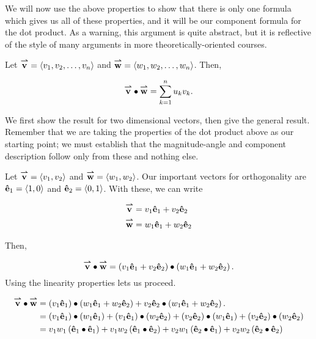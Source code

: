 \documentclass{ximera}
\begin{document}
We will now use the above properties to show that there is only one formula which gives us all of these properties, and it
will be our component formula for the dot product.  As a warning, this argument is quite abstract, but it is reflective of the style of many arguments in more theoretically-oriented courses.

\begin{theorem}
  Let ${\overset{\boldsymbol{\rightharpoonup}}{\mathbf{v}}} =\left\langle v_1,v_2,\ldots,v_n\right\rangle$ and ${\overset{\boldsymbol{\rightharpoonup}}{\mathbf{w}}} =\left\langle w_1,w_2,\ldots,w_n\right\rangle$.  Then, 
  
  \[
  {\overset{\boldsymbol{\rightharpoonup}}{\mathbf{v}}} \bullet {\overset{\boldsymbol{\rightharpoonup}}{\mathbf{w}}} = \sum_{k=1}^n u_kv_k.
  \]
\begin{explanation}
We first show the result for two dimensional vectors, then give the general result.  Remember that we are taking the properties of the dot product above as our starting point; we must establish that the magnitude-angle and component description follow only from these and nothing else.

Let ${\overset{\boldsymbol{\rightharpoonup}}{\mathbf{v}}}=\left\langle v_1,v_2\right\rangle$ and ${\overset{\boldsymbol{\rightharpoonup}}{\mathbf{w}}} = \left\langle w_1,w_2\right\rangle$.  Our important vectors for orthogonality are $\mathbf{\hat{e}}_1=\left\langle 1,0\right\rangle$ and $\mathbf{\hat{e}}_2=\left\langle 0,1\right\rangle$.  With these, we can write

\begin{align*}
{\overset{\boldsymbol{\rightharpoonup}}{\mathbf{v}}} &=  v_1\mathbf{\hat{e}}_1 +v_2\mathbf{\hat{e}}_2 \\
{\overset{\boldsymbol{\rightharpoonup}}{\mathbf{w}}} &= w_1\mathbf{\hat{e}}_1 +w_2\mathbf{\hat{e}}_2 \\
\end{align*}

Then, 

\[
{\overset{\boldsymbol{\rightharpoonup}}{\mathbf{v}}} \bullet {\overset{\boldsymbol{\rightharpoonup}}{\mathbf{w}}} = \left(v_1\mathbf{\hat{e}}_1 +v_2\mathbf{\hat{e}}_2\right) \bullet  \left(w_1\mathbf{\hat{e}}_1 +w_2\mathbf{\hat{e}}_2\right).
\]
Using the linearity properties lets us proceed.

\begin{align*}
{\overset{\boldsymbol{\rightharpoonup}}{\mathbf{v}}} \bullet {\overset{\boldsymbol{\rightharpoonup}}{\mathbf{w}}} &= \left(v_1\mathbf{\hat{e}}_1\right) \bullet  \left(w_1\mathbf{\hat{e}}_1 +w_2\mathbf{\hat{e}}_2\right) +v_2\mathbf{\hat{e}}_2 \bullet  \left(w_1\mathbf{\hat{e}}_1 +w_2\mathbf{\hat{e}}_2\right). \\
&= \left(v_1\mathbf{\hat{e}}_1\right) \bullet  \left(w_1\mathbf{\hat{e}}_1\right) +  \left(v_1\mathbf{\hat{e}}_1\right) \bullet  \left(w_2\mathbf{\hat{e}}_2\right)+ \left(v_2\mathbf{\hat{e}}_2\right) \bullet  \left(w_1\mathbf{\hat{e}}_1\right)+ \left(v_2\mathbf{\hat{e}}_2\right) \bullet  \left(w_2\mathbf{\hat{e}}_2\right) \\
&= v_1w_1 \left(\mathbf{\hat{e}}_1 \bullet \mathbf{\hat{e}}_1\right) + v_1w_2 \left(\mathbf{\hat{e}}_1 \bullet \mathbf{\hat{e}}_2\right) + v_2w_1 \left(\mathbf{\hat{e}}_2 \bullet \mathbf{\hat{e}}_1 \right)+ v_2w_2 \left(\mathbf{\hat{e}}_2 \bullet \mathbf{\hat{e}}_2\right)
\end{align*}


\end{explanation}
\end{theorem}
\end{document}
